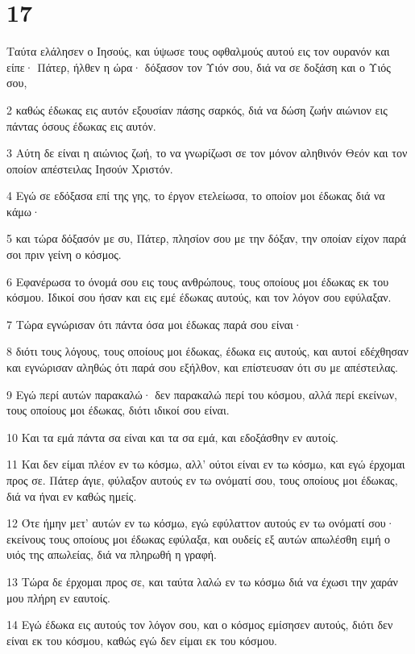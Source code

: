 \chapter{17}

\par Ταύτα ελάλησεν ο Ιησούς, και ύψωσε τους οφθαλμούς αυτού εις τον ουρανόν και είπε· Πάτερ, ήλθεν η ώρα· δόξασον τον Υιόν σου, διά να σε δοξάση και ο Υιός σου,
\par 2 καθώς έδωκας εις αυτόν εξουσίαν πάσης σαρκός, διά να δώση ζωήν αιώνιον εις πάντας όσους έδωκας εις αυτόν.
\par 3 Αύτη δε είναι η αιώνιος ζωή, το να γνωρίζωσι σε τον μόνον αληθινόν Θεόν και τον οποίον απέστειλας Ιησούν Χριστόν.
\par 4 Εγώ σε εδόξασα επί της γης, το έργον ετελείωσα, το οποίον μοι έδωκας διά να κάμω·
\par 5 και τώρα δόξασόν με συ, Πάτερ, πλησίον σου με την δόξαν, την οποίαν είχον παρά σοι πριν γείνη ο κόσμος.
\par 6 Εφανέρωσα το όνομά σου εις τους ανθρώπους, τους οποίους μοι έδωκας εκ του κόσμου. Ιδικοί σου ήσαν και εις εμέ έδωκας αυτούς, και τον λόγον σου εφύλαξαν.
\par 7 Τώρα εγνώρισαν ότι πάντα όσα μοι έδωκας παρά σου είναι·
\par 8 διότι τους λόγους, τους οποίους μοι έδωκας, έδωκα εις αυτούς, και αυτοί εδέχθησαν και εγνώρισαν αληθώς ότι παρά σου εξήλθον, και επίστευσαν ότι συ με απέστειλας.
\par 9 Εγώ περί αυτών παρακαλώ· δεν παρακαλώ περί του κόσμου, αλλά περί εκείνων, τους οποίους μοι έδωκας, διότι ιδικοί σου είναι.
\par 10 Και τα εμά πάντα σα είναι και τα σα εμά, και εδοξάσθην εν αυτοίς.
\par 11 Και δεν είμαι πλέον εν τω κόσμω, αλλ' ούτοι είναι εν τω κόσμω, και εγώ έρχομαι προς σε. Πάτερ άγιε, φύλαξον αυτούς εν τω ονόματί σου, τους οποίους μοι έδωκας, διά να ήναι εν καθώς ημείς.
\par 12 Ότε ήμην μετ' αυτών εν τω κόσμω, εγώ εφύλαττον αυτούς εν τω ονόματί σου· εκείνους τους οποίους μοι έδωκας εφύλαξα, και ουδείς εξ αυτών απωλέσθη ειμή ο υιός της απωλείας, διά να πληρωθή η γραφή.
\par 13 Τώρα δε έρχομαι προς σε, και ταύτα λαλώ εν τω κόσμω διά να έχωσι την χαράν μου πλήρη εν εαυτοίς.
\par 14 Εγώ έδωκα εις αυτούς τον λόγον σου, και ο κόσμος εμίσησεν αυτούς, διότι δεν είναι εκ του κόσμου, καθώς εγώ δεν είμαι εκ του κόσμου.
